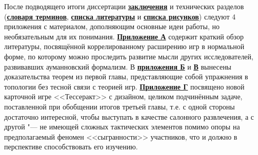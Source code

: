 

%

После подводящего итоги диссертации \underline{\textbf{заключения}} и технических разделов (\underline{\textbf{словаря терминов}}, \underline{\textbf{списка литературы}} и \underline{\textbf{списка рисунков}}) следуют 4 приложения с материалом, дополняющим основные идеи работы, но необязательным для их понимания. \underline{\textbf{Приложение А}} содержит краткий обзор литературы, посвящённой коррелированному расширению игр в нормальной форме, по которому можно проследить развитие мысли других исследователей, развивавших ауманновский формализм. В \underline{\textbf{приложения Б}} и \underline{\textbf{В}} вынесены доказательства теорем из первой главы, представляющие собой упражнения в топологии без тесной связи с теорией игр. \underline{\textbf{Приложение Г}} посвящено новой карточной игре <<Тессеракт>> с дизайном, целиком подчинённым задаче, поставленной при обобщении итогов третьей главы, т.е. с одной стороны достаточно интересной, чтобы выступать в качестве салонного развлечения, а с другой "--- не имеющей сложных тактических элементов помимо опоры на предполагаемый феномен <<сыгранности>> участников, что и должно в перспективе способствовать его изучению.

